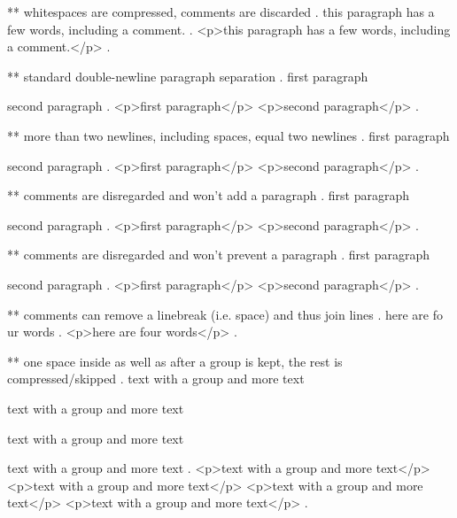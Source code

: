 ** whitespaces are compressed, comments are discarded
.
   this     paragraph  has a    few 
 words,   including
a comment.
.
<p>this paragraph has a few words, including a comment.</p>
.


** standard double-newline paragraph separation
.
first paragraph

second paragraph
.
<p>first paragraph</p>
<p>second paragraph</p>
.



** more than two newlines, including spaces, equal two newlines
.
first paragraph

   
  


second paragraph
.
<p>first paragraph</p>
<p>second paragraph</p>
.


** comments are disregarded and won't add a paragraph
.
first paragraph




second paragraph
.
<p>first paragraph</p>
<p>second paragraph</p>
.

** comments are disregarded and won't prevent a paragraph
.
first paragraph %

second paragraph
.
<p>first paragraph</p>
<p>second paragraph</p>
.


** comments can remove a linebreak (i.e. space) and thus join lines
.
here are fo%
ur words
.
<p>here are four words</p>
.


** one space inside as well as after a group is kept, the rest is compressed/skipped
.
text with {a group} and more text

text with { a group } and more text

text with { a group  } and more text

text with {  a group  }  and more text
.
<p>text with a group and more text</p>
<p>text with  a group  and more text</p>
<p>text with  a group  and more text</p>
<p>text with  a group  and more text</p>
.
